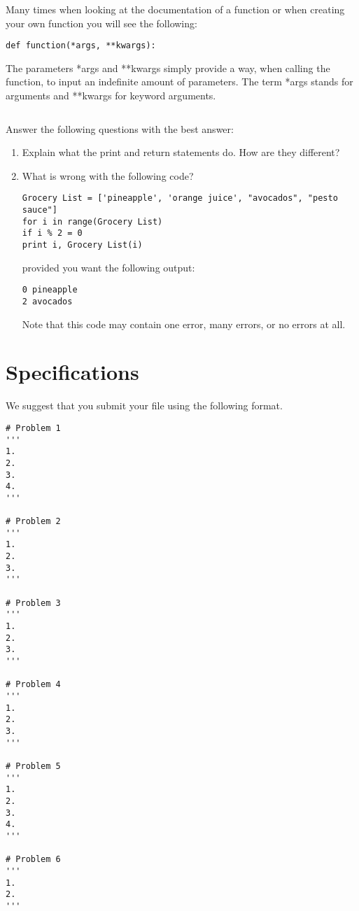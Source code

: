 \begin{example}
Many times when looking at the documentation of a function or when creating your own function you will see the following:

\begin{lstlisting}
def function(*args, **kwargs):
\end{lstlisting}

The parameters *args and **kwargs simply provide a way, when calling the function, to input an indefinite amount of parameters.  The term *args stands for arguments and **kwargs for keyword arguments.  

\begin{lstlisting}

\end{lstlisting}

\end{example}

\begin{problem}
Answer the following questions with the best answer:

\begin{enumerate}
\item Explain what the print and return statements do. How are they different?
\item What is wrong with the following code?
\begin{lstlisting}
Grocery List = ['pineapple', 'orange juice', "avocados", "pesto sauce"]
for i in range(Grocery List)
if i % 2 = 0
print i, Grocery List(i)
\end{lstlisting}
provided you want the following output:
\begin{lstlisting}
0 pineapple
2 avocados
\end{lstlisting}
Note that this code may contain one error, many errors, or no errors at all.

\end{enumerate}
\end{problem}



\section*{Specifications}
We suggest that you submit your  file using the following format.
\begin{lstlisting}
# Problem 1
'''
1. 
2. 
3. 
4.  
'''

# Problem 2	
'''
1. 
2.
3.  
'''

# Problem 3
'''	
1.
2.
3.
'''

# Problem 4
'''
1. 
2. 
3. 
'''

# Problem 5
'''
1. 
2. 
3.
4.  
'''

# Problem 6
'''
1. 
2.  
'''
\end{lstlisting}	
